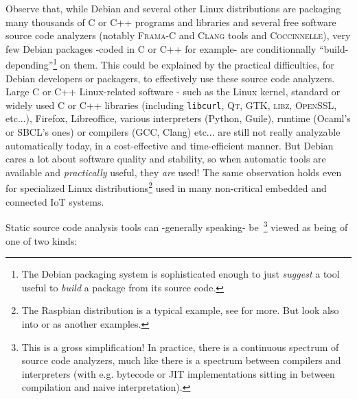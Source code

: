 Observe that, while Debian and several other Linux distributions are
packaging many thousands of C or C++ programs and libraries and
several free software source code analyzers (notably \textsc{Frama-C}
and \textsc{Clang} tools and \textsc{Coccinnelle}), very few Debian
packages -coded in C or C++ for example- are conditionnally
``build-depending''\footnote{The Debian packaging system is
  sophisticated enough to just \emph{suggest} a tool useful to
  \emph{build} a package from its source code.} on them. This could be
explained by the practical difficulties, for Debian developers or
packagers, to effectively use these source code analyzers. Large C or
C++ Linux-related software - such as the Linux kernel, standard or
widely used C or C++ libraries (including \texttt{libcurl},
\textsc{Qt}, \textsc{GTK}, \textsc{libz}, \textsc{OpenSSL}, etc...),
Firefox, Libreoffice, various interpreters (Python, Guile), runtime
(Ocaml's or SBCL's ones) or compilers (GCC, Clang) etc... are still
not really analyzable automatically today, in a cost-effective and
time-efficient manner. But Debian cares a lot about software quality
and stability, so when automatic tools are available and
\emph{practically} useful, they \emph{are} used! The same observation
holds even for specialized Linux distributions\footnote{The Raspbian
  distribution is a typical example, see 
  for more. But look also into
   or
   as another examples.} used in many
non-critical embedded and connected IoT systems.


\medskip

Static source code analysis tools  can -generally speaking-
be~\footnote{This is a gross simplification! In practice, there is a
  continuous spectrum of source code analyzers, much like there is a
  spectrum between compilers and interpreters (with e.g. bytecode or
  JIT implementations sitting in between compilation and naive
  interpretation).} viewed as being of one of two kinds:


